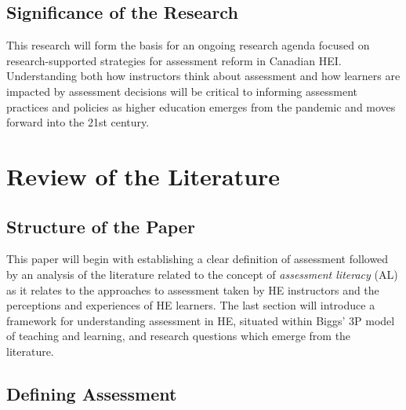 \documentclass[
]{book}
\begin{document}
\hypertarget{significance-of-the-research}{%
\section*{Significance of the Research}\label{significance-of-the-research}}

This research will form the basis for an ongoing research agenda focused on research-supported strategies for assessment reform in Canadian HEI. Understanding both how instructors think about assessment and how learners are impacted by assessment decisions will be critical to informing assessment practices and policies as higher education emerges from the pandemic and moves forward into the 21st century.

\hypertarget{review-of-the-literature}{%
\chapter*{Review of the Literature}\label{review-of-the-literature}}

\hypertarget{structure-of-the-paper}{%
\section*{Structure of the Paper}\label{structure-of-the-paper}}

This paper will begin with establishing a clear definition of assessment followed by an analysis of the literature related to the concept of \emph{assessment literacy} (AL) \citep{delucaDifferentialSituatedView2019} as it relates to the approaches to assessment \citep{delucaApproachesClassroomAssessment2016} taken by HE instructors and the perceptions and experiences of HE learners. The last section will introduce a framework for understanding assessment in HE, situated within Biggs' \citetext{\citeyear{biggsWhatStudentDoes1999}; \citeyear{biggsTheoryPracticeCognitive1993}} 3P model of teaching and learning, and research questions which emerge from the literature.

\hypertarget{defining-assessment}{%
\section*{Defining Assessment}\label{defining-assessment}}
\end{document}
